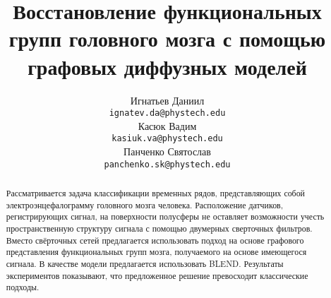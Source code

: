 \documentclass{article}
\title{Восстановление функциональных групп головного мозга с помощью графовых диффузных моделей}
\author{
    Игнатьев Даниил \\
	\texttt{ignatev.da@phystech.edu} \\
	\And
	Касюк Вадим \\
	\texttt{kasiuk.va@phystech.edu} \\
	\And
	Панченко Святослав \\
	\texttt{panchenko.sk@phystech.edu}
}
\date{}
\begin{document}
\maketitle

\begin{abstract}
Рассматривается задача классификации временных рядов, представляющих собой электроэнцефалограмму головного мозга человека. Расположение датчиков, регистрирующих сигнал, на поверхности полусферы не оставляет возможности учесть пространственную структуру сигнала с помощью двумерных сверточных фильтров. Вместо свёрточных сетей предлагается использовать подход на основе графового представления функциональных групп мозга, получаемого на основе имеющегося сигнала. В качестве модели предлагается использовать BLEND. Результаты экспериментов показывают, что предложенное решение превосходит классические подходы.

\end{abstract}


\end{document}
